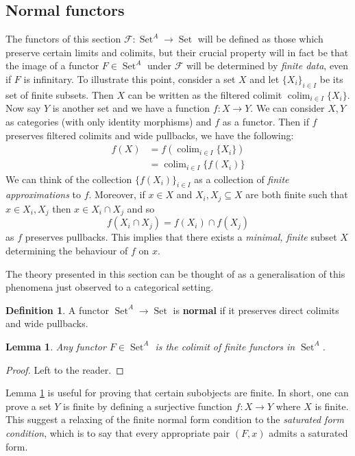 \documentclass[12pt]{article}
\theoremstyle{plain}
\newtheorem{lemma}[thm]{Lemma}
\theoremstyle{definition}
\newtheorem{defn}[thm]{Definition} %
\newcommand{\scr}[1]{\mathscr{#1}}
\newcommand{\lto}{\longrightarrow}
\DeclareMathOperator{\set}{Set}
\DeclareMathOperator*{\colim}{colim}
\begin{document}
\subsection{Normal functors}
\label{sec:normal_functors}
The functors of this section $\scr{F}: \set^A \lto \set$ will be defined as those which preserve certain limits and colimits, but their crucial property will in fact be that the image of a functor $F \in \set^A$ under $\scr{F}$ will be determined by \emph{finite data}, even if $F$ is infinitary. To illustrate this point, consider a set $X$ and let $\{ X_i \}_{i \in I}$ be its set of finite subsets. Then $X$ can be written as the filtered colimit $\colim_{i \in I}\{ X_i \}$. Now say $Y$ is another set and we have a function $f: X \lto Y$. We can consider $X,Y$ as categories (with only identity morphisms) and $f$ as a functor. Then if $f$ preserves filtered colimits and wide pullbacks, we have the following:
\begin{align*}
    f(X) &= f(\colim_{i \in I}\{ X_i \})\\
    &= \colim_{i \in I}\{ f(X_i) \} 
\end{align*}
We can think of the collection $\{ f(X_i) \}_{i \in I}$ as a collection of \emph{finite approximations} to $f$. Moreover, if $x \in X$ and $X_i, X_j \subseteq X$ are both finite such that $x \in X_i, X_j$ then $x \in X_i \cap X_j$ and so
\begin{equation}
f(X_i \cap X_j) = f(X_i) \cap f(X_j)
\end{equation}
as $f$ preserves pullbacks. This implies that there exists a \emph{minimal, finite} subset $X$ determining the behaviour of $f$ on $x$.

The theory presented in this section can be thought of as a generalisation of this phenomena just observed to a categorical setting.

	\begin{defn}\label{def:normal_functor}
		A functor $\set^A \lto \set$ is \textbf{normal} if it preserves direct colimits and wide pullbacks.
		\end{defn}

  \begin{lemma}\label{lem:finite_generation_functors}
		Any functor $F \in \set^A$ is the colimit of finite functors in $\set^A$.
		\end{lemma}
	\begin{proof}
	    Left to the reader.
	\end{proof}

 Lemma \ref{lem:finite_generation_functors} is useful for proving that certain subobjects are finite. In short, one can prove a set $Y$ is finite by defining a surjective function $f: X \lto Y$ where $X$ is finite. This suggest a relaxing of the finite normal form condition to the \emph{saturated form condition}, which is to say that every appropriate pair $(F,x)$ admits a saturated form.
\end{document}
